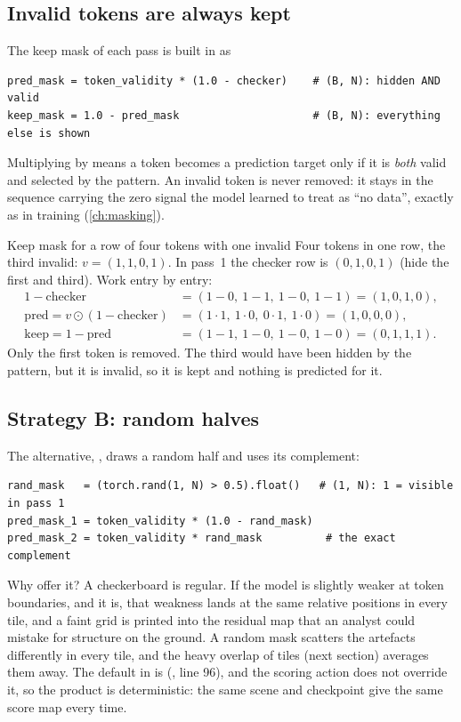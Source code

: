 \subsection{Invalid tokens are always kept}

The keep mask of each pass is built in  as
\begin{lstlisting}
pred_mask = token_validity * (1.0 - checker)    # (B, N): hidden AND valid
keep_mask = 1.0 - pred_mask                     # (B, N): everything else is shown
\end{lstlisting}
Multiplying by  means a token becomes a prediction target only if it is \emph{both}
valid and selected by the pattern. An invalid token is never removed: it stays in the sequence carrying
the zero signal the model learned to treat as ``no data'', exactly as in training (\cref{ch:masking}).

\begin{worked}[label={we:inference:keep}]{Keep mask for a row of four tokens with one invalid}
Four tokens in one row, the third invalid: $v=(1,1,0,1)$. In pass~1 the checker row is $(0,1,0,1)$ (hide
the first and third). Work entry by entry:
\begin{align*}
1-\text{checker} &= (1-0,\ 1-1,\ 1-0,\ 1-1) = (1,0,1,0),\\
\text{pred} = v\odot(1-\text{checker}) &= (1\cdot1,\ 1\cdot0,\ 0\cdot1,\ 1\cdot0) = (1,0,0,0),\\
\text{keep} = 1-\text{pred} &= (1-1,\ 1-0,\ 1-0,\ 1-0) = (0,1,1,1).
\end{align*}
Only the first token is removed. The third would have been hidden by the pattern, but it is invalid, so it
is kept and nothing is predicted for it.
\end{worked}

\subsection{Strategy B: random halves}

The alternative, , draws a random half and uses its complement:
\begin{lstlisting}
rand_mask   = (torch.rand(1, N) > 0.5).float()   # (1, N): 1 = visible in pass 1
pred_mask_1 = token_validity * (1.0 - rand_mask)
pred_mask_2 = token_validity * rand_mask          # the exact complement
\end{lstlisting}
Why offer it? A checkerboard is regular. If the model is slightly weaker at token boundaries, and it is,
that weakness lands at the same relative positions in every tile, and a faint grid is printed into the
residual map that an analyst could mistake for structure on the ground. A random mask scatters the
artefacts differently in every tile, and the heavy overlap of tiles (next section) averages them away. The
default in  is 
(, line 96), and the scoring action does not override it, so
the product is deterministic: the same scene and checkpoint give the same score map every time.

